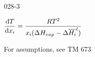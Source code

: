 \begin{mitframe}{028-3}

    
\begin{listone}
        
    \item $\dfrac{\mathrm{d}\Temp}{\mathrm{d}\specfrac{\state}}=\dfrac{\gasconst\Temp^{2}}{\specfrac{\state}(\Delta\enthalpy_{vap}-\Delta\overline{\enthalpy_{i}}^{l})}$
    
    
 	\item For assumptions, see TM 673
   
\end{listone}			

\end{mitframe}